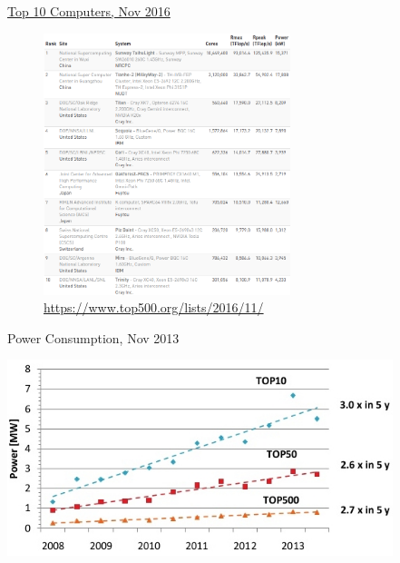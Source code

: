 \documentclass[xcolor=x11names,compress]{beamer}
\renewcommand{\(}{\begin{columns}}
\renewcommand{\)}{\end{columns}}
\newcommand{\<}[1]{\begin{column}{#1}}
\renewcommand{\>}{\end{column}}
\begin{document}
\begin{frame}{\href{https://www.top500.org/lists/2016/11/}{Top 10 Computers, Nov 2016}}

\begin{center}
\begin{figure}
\includegraphics[height=3in]{../figs/2016-top-10}
\caption{\url{https://www.top500.org/lists/2016/11/}}
\end{figure}
\end{center}

\end{frame}

\begin{frame}{Power Consumption, Nov 2013}

\begin{center}
\includegraphics[height=2.25in]{../figs/Top500-power}
\end{center}

\end{frame}
\end{document}
